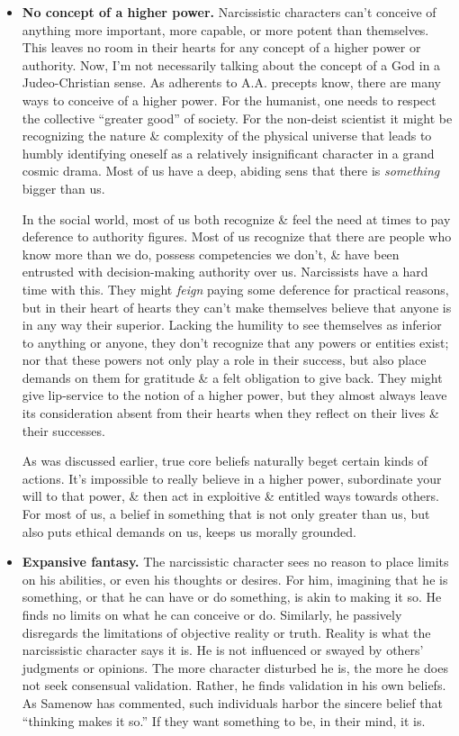 \documentclass{article}
\numberwithin{equation}{section}
\begin{document}
\begin{itemize}
	\item \textbf{No concept of a higher power.} Narcissistic characters can't conceive of anything more important, more capable, or more potent than themselves. This leaves no room in their hearts for any concept of a higher power or authority. Now, I'm not necessarily talking about the concept of a God in a Judeo-Christian sense. As adherents to A.A. precepts know, there are many ways to conceive of a higher power. For the humanist, one needs to respect the collective ``greater good'' of society. For the non-deist scientist it might be recognizing the nature \& complexity of the physical universe that leads to humbly identifying oneself as a relatively insignificant character in a grand cosmic drama. Most of us have a deep, abiding sens that there is \textit{something} bigger than us.
	
	In the social world, most of us both recognize \& feel the need at times to pay deference to authority figures. Most of us recognize that there are people who know more than we do, possess competencies we don't, \& have been entrusted with decision-making authority over us. Narcissists have a hard time with this. They might \textit{feign} paying some deference for practical reasons, but in their heart of hearts they can't make themselves believe that anyone is in any way their superior. Lacking the humility to see themselves as inferior to anything or anyone, they don't recognize that any powers or entities exist; nor that these powers not only play a role in their success, but also place demands on them for gratitude \& a felt obligation to give back. They might give lip-service to the notion of a higher power, but they almost always leave its consideration absent from their hearts when they reflect on their lives \& their successes.
	
	As was discussed earlier, true core beliefs naturally beget certain kinds of actions. It's impossible to really believe in a higher power, subordinate your will to that power, \& then act in exploitive \& entitled ways towards others. For most of us, a belief in something that is not only greater than us, but also puts ethical demands on us, keeps us morally grounded.
	\item \textbf{Expansive fantasy.} The narcissistic character sees no reason to place limits on his abilities, or even his thoughts or desires. For him, imagining that he is something, or that he can have or do something, is akin to making it so. He finds no limits on what he can conceive or do. Similarly, he passively disregards the limitations of objective reality or truth. Reality is what the narcissistic character says it is. He is not influenced or swayed by others' judgments or opinions. The more character disturbed he is, the more he does not seek consensual validation. Rather, he finds validation in his own beliefs. As Samenow has commented, such individuals harbor the sincere belief that ``thinking makes it so.'' If they want something to be, in their mind, it is.
	

\end{itemize}
\end{document}
